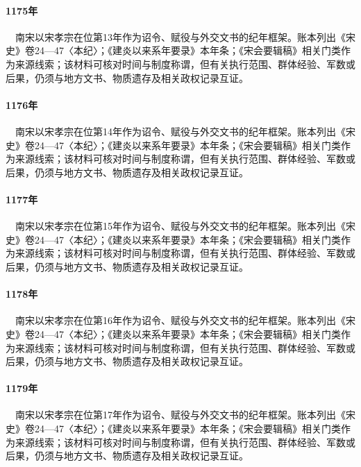 \paragraph{1175年}　南宋以宋孝宗在位第13年作为诏令、赋役与外交文书的纪年框架。账本列出《宋史》卷24—47〈本纪〉；《建炎以来系年要录》本年条；《宋会要辑稿》相关门类作为来源线索；该材料可核对时间与制度称谓，但有关执行范围、群体经验、军数或后果，仍须与地方文书、物质遗存及相关政权记录互证。

\paragraph{1176年}　南宋以宋孝宗在位第14年作为诏令、赋役与外交文书的纪年框架。账本列出《宋史》卷24—47〈本纪〉；《建炎以来系年要录》本年条；《宋会要辑稿》相关门类作为来源线索；该材料可核对时间与制度称谓，但有关执行范围、群体经验、军数或后果，仍须与地方文书、物质遗存及相关政权记录互证。

\paragraph{1177年}　南宋以宋孝宗在位第15年作为诏令、赋役与外交文书的纪年框架。账本列出《宋史》卷24—47〈本纪〉；《建炎以来系年要录》本年条；《宋会要辑稿》相关门类作为来源线索；该材料可核对时间与制度称谓，但有关执行范围、群体经验、军数或后果，仍须与地方文书、物质遗存及相关政权记录互证。

\paragraph{1178年}　南宋以宋孝宗在位第16年作为诏令、赋役与外交文书的纪年框架。账本列出《宋史》卷24—47〈本纪〉；《建炎以来系年要录》本年条；《宋会要辑稿》相关门类作为来源线索；该材料可核对时间与制度称谓，但有关执行范围、群体经验、军数或后果，仍须与地方文书、物质遗存及相关政权记录互证。

\paragraph{1179年}　南宋以宋孝宗在位第17年作为诏令、赋役与外交文书的纪年框架。账本列出《宋史》卷24—47〈本纪〉；《建炎以来系年要录》本年条；《宋会要辑稿》相关门类作为来源线索；该材料可核对时间与制度称谓，但有关执行范围、群体经验、军数或后果，仍须与地方文书、物质遗存及相关政权记录互证。

